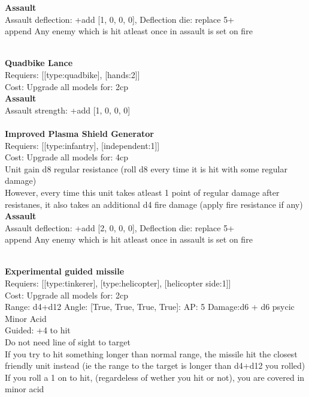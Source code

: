 {\bf Assault} \ \\
Assault deflection: +add [1, 0, 0, 0], Deflection die: replace 5+
\\ 

append Any enemy which is hit atleast once in assault is set on fire


\ \\
{\bf Quadbike Lance } \\

Requiers: [[type:quadbike], [hands:2]] \\
Cost: Upgrade all models for: 2cp \\




{\bf Assault} \ \\
Assault strength: +add [1, 0, 0, 0] 
\\ 




\ \\
{\bf Improved Plasma Shield Generator } \\

Requiers: [[type:infantry], [independent:1]] \\
Cost: Upgrade all models for: 4cp \\
Unit gain d8 regular resistance (roll d8 every time it is hit with some regular damage)\\ 
However, every time this unit takes atleast 1 point of regular damage after resistanes, it also takes an additional d4 fire damage (apply fire resistance if any)\\ 




{\bf Assault} \ \\
Assault deflection: +add [2, 0, 0, 0], Deflection die: replace 5+
\\ 

append Any enemy which is hit atleast once in assault is set on fire


\ \\
{\bf Experimental guided missile } \\

Requiers: [[type:tinkerer], [type:helicopter], [helicopter side:1]] \\
Cost: Upgrade all models for: 2cp \\


Range: d4+d12  Angle: [True, True, True, True]: AP: 5 Damage:d6 + d6 psycic \\
Minor Acid\\ 
Guided: +4 to hit\\ 
Do not need line of sight to target\\ 
If you try to hit something longer than normal range, the missile hit the closest friendly unit instead (ie the range to the target is longer than d4+d12 you rolled)\\ 
If you roll a 1 on to hit, (regardeless of wether you hit or not), you are covered in minor acid\\ 








